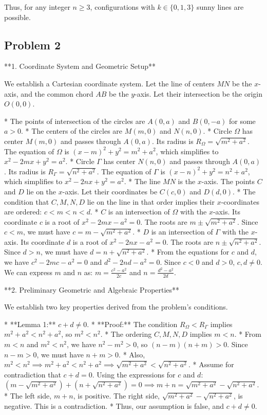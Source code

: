 \documentclass[12pt]{article}
\begin{document}
Thus, for any integer $n \ge 3$, configurations with $k \in \{0, 1, 3\}$ sunny lines are possible.

\subsection{Problem 2}

**1. Coordinate System and Geometric Setup**

We establish a Cartesian coordinate system. Let the line of centers $MN$ be the $x$-axis, and the common chord $AB$ be the $y$-axis. Let their intersection be the origin $O(0,0)$.

*   The points of intersection of the circles are $A(0,a)$ and $B(0,-a)$ for some $a>0$.
*   The centers of the circles are $M(m,0)$ and $N(n,0)$.
*   Circle $\Omega$ has center $M(m,0)$ and passes through $A(0,a)$. Its radius is $R_\Omega = \sqrt{m^2+a^2}$. The equation of $\Omega$ is $(x-m)^2+y^2 = m^2+a^2$, which simplifies to $x^2-2mx+y^2=a^2$.
*   Circle $\Gamma$ has center $N(n,0)$ and passes through $A(0,a)$. Its radius is $R_\Gamma = \sqrt{n^2+a^2}$. The equation of $\Gamma$ is $(x-n)^2+y^2 = n^2+a^2$, which simplifies to $x^2-2nx+y^2=a^2$.
*   The line $MN$ is the $x$-axis. The points $C$ and $D$ lie on the $x$-axis. Let their coordinates be $C(c,0)$ and $D(d,0)$.
*   The condition that $C, M, N, D$ lie on the line in that order implies their $x$-coordinates are ordered: $c < m < n < d$.
*   $C$ is an intersection of $\Omega$ with the $x$-axis. Its coordinate $c$ is a root of $x^2-2mx-a^2=0$. The roots are $m \pm \sqrt{m^2+a^2}$. Since $c<m$, we must have $c = m-\sqrt{m^2+a^2}$.
*   $D$ is an intersection of $\Gamma$ with the $x$-axis. Its coordinate $d$ is a root of $x^2-2nx-a^2=0$. The roots are $n \pm \sqrt{n^2+a^2}$. Since $d>n$, we must have $d=n+\sqrt{n^2+a^2}$.
*   From the equations for $c$ and $d$, we have $c^2-2mc-a^2=0$ and $d^2-2nd-a^2=0$. Since $c<0$ and $d>0$, $c,d \neq 0$. We can express $m$ and $n$ as:
    $m = \frac{c^2-a^2}{2c}$ and $n = \frac{d^2-a^2}{2d}$.

**2. Preliminary Geometric and Algebraic Properties**

We establish two key properties derived from the problem's conditions.

*   **Lemma 1:** $c+d \neq 0$.
    *   **Proof:** The condition $R_\Omega < R_\Gamma$ implies $m^2+a^2 < n^2+a^2$, so $m^2 < n^2$.
    *   The ordering $C,M,N,D$ implies $m<n$.
    *   From $m<n$ and $m^2<n^2$, we have $n^2-m^2 > 0$, so $(n-m)(n+m)>0$. Since $n-m>0$, we must have $n+m>0$.
    *   Also, $m^2 < n^2 \implies m^2+a^2 < n^2+a^2 \implies \sqrt{m^2+a^2} < \sqrt{n^2+a^2}$.
    *   Assume for contradiction that $c+d=0$. Using the expressions for $c$ and $d$:
        $(m-\sqrt{m^2+a^2}) + (n+\sqrt{n^2+a^2}) = 0 \implies m+n = \sqrt{m^2+a^2} - \sqrt{n^2+a^2}$.
    *   The left side, $m+n$, is positive. The right side, $\sqrt{m^2+a^2} - \sqrt{n^2+a^2}$, is negative. This is a contradiction.
    *   Thus, our assumption is false, and $c+d \neq 0$.
\end{document}

